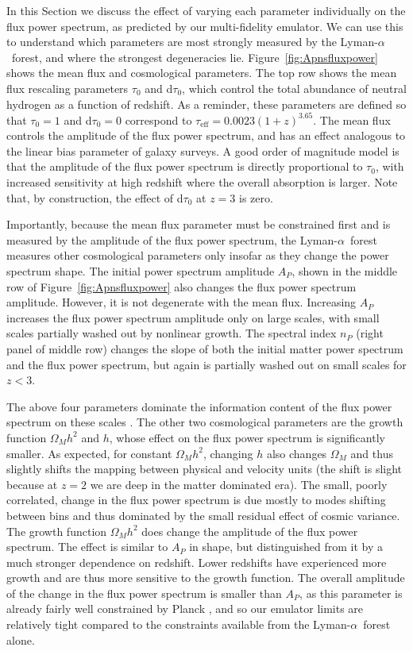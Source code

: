 \documentclass[a4paper,11pt]{article}
\newcommand{\Lya}{Lyman-$\alpha$}
\begin{document}
In this Section we discuss the effect of varying each parameter individually on the flux power spectrum, as predicted by our multi-fidelity emulator. We can use this to understand which parameters are most strongly measured by the \Lya~forest, and where the strongest degeneracies lie. Figure~\ref{fig:Apnsfluxpower} shows the mean flux and cosmological parameters. The top row shows the mean flux rescaling parameters $\tau_0$ and d$\tau_0$, which control the total abundance of neutral hydrogen as a function of redshift. As a reminder, these parameters are defined so that  $\tau_0 = 1$ and d$\tau_0 = 0$ correspond to $\tau_\mathrm{eff} = 0.0023 (1+z)^{3.65}$. The mean flux controls the amplitude of the flux power spectrum, and has an effect analogous to the linear bias parameter of galaxy surveys. A good order of magnitude model is that the amplitude of the flux power spectrum is directly proportional to $\tau_0$, with increased sensitivity at high redshift where the overall absorption is larger. Note that, by construction, the effect of d$\tau_0$ at $z=3$ is zero.

Importantly, because the mean flux parameter must be constrained first and is measured by the amplitude of the flux power spectrum, the \Lya~forest measures other cosmological parameters only insofar as they change the power spectrum shape. The initial power spectrum  amplitude $A_P$, shown in the middle row of Figure~\ref{fig:Apnsfluxpower} also changes the flux power spectrum amplitude. However, it is not degenerate with the mean flux. Increasing $A_P$ increases the flux power spectrum amplitude only on large scales, with small scales partially washed out by nonlinear growth. The spectral index $n_P$ (right panel of middle row) changes the slope of both the initial matter power spectrum and the flux power spectrum, but again is partially washed out on small scales for $z < 3$.

The above four parameters dominate the information content of the flux power spectrum on these scales \cite{Pedersen:2022}. The other two cosmological parameters are the growth function $\Omega_M h^2$ and $h$, whose effect on the flux power spectrum is significantly smaller. As expected, for constant $\Omega_M h^2$, changing $h$ also changes $\Omega_M$ and thus slightly shifts the mapping between physical and velocity units (the shift is slight because at $z=2$ we are deep in the matter dominated era). The small, poorly correlated, change in the flux power spectrum is due mostly to modes shifting between bins and thus dominated by the small residual effect of cosmic variance. The growth function $\Omega_M h^2$ does change the amplitude of the flux power spectrum. The effect is similar to $A_P$ in shape, but distinguished from it by a much stronger dependence on redshift. Lower redshifts have experienced more growth and are thus more sensitive to the growth function. The overall amplitude of the change in the flux power spectrum is smaller than $A_P$, as this parameter is already fairly well constrained by Planck \cite{Planck:2018}, and so our emulator limits are relatively tight compared to the constraints available from the \Lya~forest alone.
\end{document}
